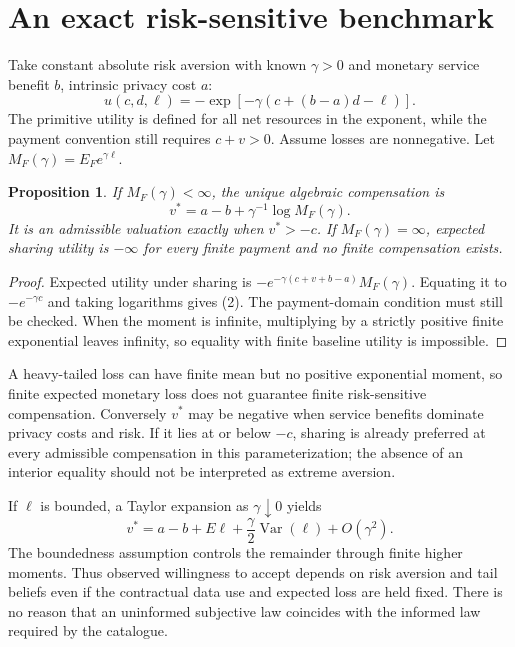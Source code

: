 \documentclass[11pt,a4paper]{article}
\newtheorem{proposition}[theorem]{Proposition}
\DeclareMathOperator{\Var}{Var}
\begin{document}
\section{An exact risk-sensitive benchmark}
Take constant absolute risk aversion with known $\gamma>0$ and monetary service benefit $b$, intrinsic privacy cost $a$:
\[
 u(c,d,\ell)=-\exp[-\gamma(c+(b-a)d-\ell)].
\]
The primitive utility is defined for all net resources in the exponent, while the payment convention still requires $c+v>0$. Assume losses are nonnegative. Let $M_F(\gamma)=E_Fe^{\gamma\ell}$.
\begin{proposition}
If $M_F(\gamma)<\infty$, the unique algebraic compensation is
\[
 v^*=a-b+\gamma^{-1}\log M_F(\gamma).
\tag{2}
\]
It is an admissible valuation exactly when $v^*>-c$. If $M_F(\gamma)=\infty$, expected sharing utility is $-\infty$ for every finite payment and no finite compensation exists.
\end{proposition}
\begin{proof}
Expected utility under sharing is
$-e^{-\gamma(c+v+b-a)}M_F(\gamma)$. Equating it to $-e^{-\gamma c}$ and taking logarithms gives (2). The payment-domain condition must still be checked. When the moment is infinite, multiplying by a strictly positive finite exponential leaves infinity, so equality with finite baseline utility is impossible.
\end{proof}
A heavy-tailed loss can have finite mean but no positive exponential moment, so finite expected monetary loss does not guarantee finite risk-sensitive compensation. Conversely $v^*$ may be negative when service benefits dominate privacy costs and risk. If it lies at or below $-c$, sharing is already preferred at every admissible compensation in this parameterization; the absence of an interior equality should not be interpreted as extreme aversion.

If $\ell$ is bounded, a Taylor expansion as $\gamma\downarrow0$ yields
\[
 v^*=a-b+E\ell+\frac\gamma2\Var(\ell)+O(\gamma^2).
\]
The boundedness assumption controls the remainder through finite higher moments. Thus observed willingness to accept depends on risk aversion and tail beliefs even if the contractual data use and expected loss are held fixed. There is no reason that an uninformed subjective law coincides with the informed law required by the catalogue.
\end{document}
